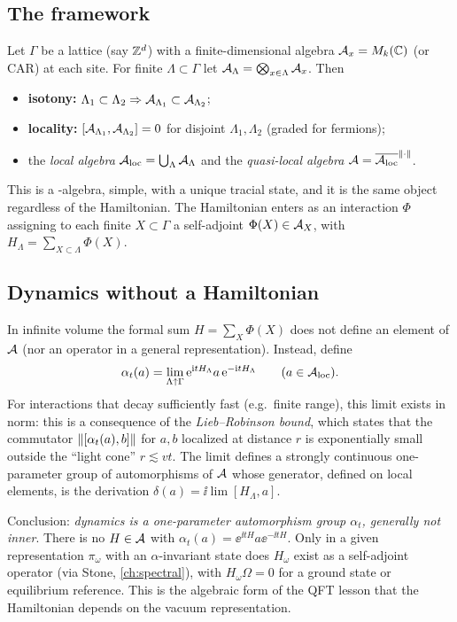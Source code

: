 \subsection{The framework}

Let $\Gamma$ be a lattice (say $\mathbb{Z}^d$) with a finite-dimensional algebra $\mathcal{A}_x=M_k(\mathbb{C})$ (or CAR) at each site. For finite $\Lambda\subset\Gamma$ let $\mathcal{A}_\Lambda=\bigotimes_{x\in\Lambda}\mathcal{A}_x$. Then
\begin{itemize}
\item \textbf{isotony:} $\Lambda_1\subset\Lambda_2\Rightarrow\mathcal{A}_{\Lambda_1}\subset\mathcal{A}_{\Lambda_2}$;
\item \textbf{locality:} $[\mathcal{A}_{\Lambda_1},\mathcal{A}_{\Lambda_2}]=0$ for disjoint $\Lambda_1,\Lambda_2$ (graded for fermions);
\item the \emph{local algebra} $\mathcal{A}_{\rm loc}=\bigcup_\Lambda\mathcal{A}_\Lambda$ and the \emph{quasi-local algebra} $\mathcal{A}=\overline{\mathcal{A}_{\rm loc}}^{\lVert \cdot\rVert}$.
\end{itemize}
This is a \cstar-algebra, simple, with a unique tracial state, and it is the same object regardless of the Hamiltonian. The Hamiltonian enters as an interaction $\Phi$ assigning to each finite $X\subset\Gamma$ a self-adjoint $\Phi(X)\in\mathcal{A}_X$, with $H_\Lambda=\sum_{X\subset\Lambda}\Phi(X)$.

\subsection{Dynamics without a Hamiltonian}

In infinite volume the formal sum $H=\sum_X\Phi(X)$ does not define an element of $\mathcal{A}$ (nor an operator in a general representation). Instead, define
\begin{equation}
\alpha_t(a)=\lim_{\Lambda\uparrow\Gamma}\mathrm{e}^{\mathrm{i} tH_\Lambda}a\,\mathrm{e}^{-\mathrm{i} tH_\Lambda}\qquad(a\in\mathcal{A}_{\rm loc}).
\end{equation}
For interactions that decay sufficiently fast (e.g.\ finite range), this limit exists in norm: this is a consequence of the \emph{Lieb--Robinson bound}, which states that the commutator $\lVert [\alpha_t(a),b]\rVert$ for $a,b$ localized at distance $r$ is exponentially small outside the ``light cone'' $r\lesssim vt$. The limit defines a strongly continuous one-parameter group of automorphisms of $\mathcal{A}$ whose generator, defined on local elements, is the derivation $\delta(a)=\ii\lim[H_\Lambda,a]$.

Conclusion: \emph{dynamics is a one-parameter automorphism group $\alpha_t$, generally not inner}. There is no $H\in\mathcal{A}$ with $\alpha_t(a)=\ee^{\ii tH}a\ee^{-\ii tH}$. Only in a given representation $\pi_\omega$ with an $\alpha$-invariant state does $H_\omega$ exist as a self-adjoint operator (via Stone, \cref{ch:spectral}), with $H_\omega\Omega=0$ for a ground state or equilibrium reference. This is the algebraic form of the QFT lesson that the Hamiltonian depends on the vacuum representation.

